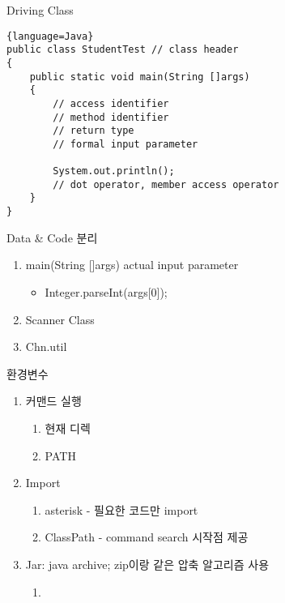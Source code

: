 \documentclass[11pt]{article}
\begin{document}
\bigskip
{\Large Driving Class}
\begin{lstlisting}{language=Java}
public class StudentTest // class header
{
    public static void main(String []args)
    {
        // access identifier
        // method identifier
        // return type      
        // formal input parameter

        System.out.println();
        // dot operator, member access operator
    }
}
\end{lstlisting}
\bigskip
{\Large Data \& Code 분리}
\begin{enumerate}
    \item main(String []args) actual input parameter
    \begin{itemize}
        \item Integer.parseInt(args[0]);
    \end{itemize}
    \item Scanner Class
    \item Chn.util
\end{enumerate}
\bigskip
{\Large 환경변수}
\begin{enumerate}
    \item 커맨드 실행
    \begin{enumerate}
        \item 현재 디렉
        \item PATH
    \end{enumerate}
    \item Import
    \begin{enumerate}
        \item asterisk - 필요한 코드만 import
        \item ClassPath - command search 시작점 제공
    \end{enumerate}
    \item Jar: java archive; zip이랑 같은 압축 알고리즘 사용
    \begin{enumerate}
        \item 
    \end{enumerate}
\end{enumerate}
\end{document}
